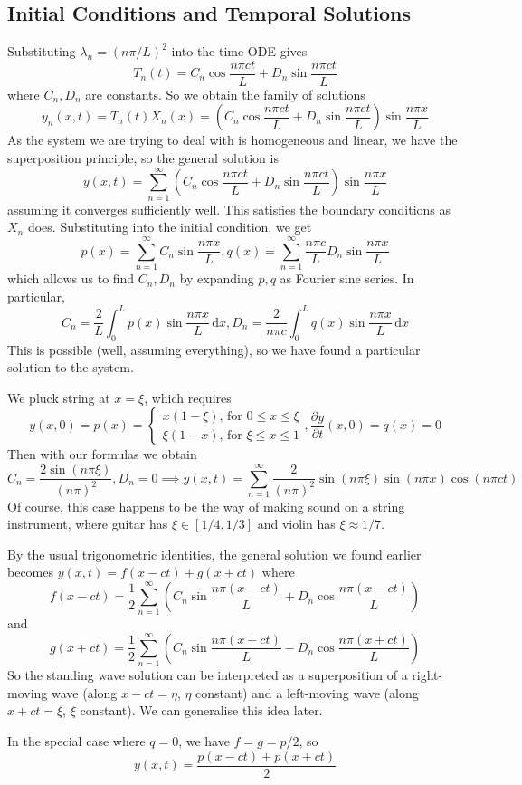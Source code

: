 \subsection{Initial Conditions and Temporal Solutions}
Substituting $\lambda_n=(n\pi/L)^2$ into the time ODE gives
$$T_n(t)=C_n\cos\frac{n\pi ct}{L}+D_n\sin\frac{n\pi ct}{L}$$
where $C_n,D_n$ are constants.
So we obtain the family of solutions
$$y_n(x,t)=T_n(t)X_n(x)=\left( C_n\cos\frac{n\pi ct}{L}+D_n\sin\frac{n\pi ct}{L} \right)\sin\frac{n\pi x}{L}$$
As the system we are trying to deal with is homogeneous and linear, we have the superposition principle, so the general solution is
$$y(x,t)=\sum_{n=1}^\infty\left( C_n\cos\frac{n\pi ct}{L}+D_n\sin\frac{n\pi ct}{L} \right)\sin\frac{n\pi x}{L}$$
assuming it converges sufficiently well.
This satisfies the boundary conditions as $X_n$ does.
Substituting into the initial condition, we get
$$p(x)=\sum_{n=1}^\infty C_n\sin\frac{n\pi x}{L},q(x)=\sum_{n=1}^\infty\frac{n\pi c}{L}D_n\sin\frac{n\pi x}{L}$$
which allows us to find $C_n,D_n$ by expanding $p,q$ as Fourier sine series.
In particular,
$$C_n=\frac{2}{L}\int_0^Lp(x)\sin\frac{n\pi x}{L}\,\mathrm dx,D_n=\frac{2}{n\pi c}\int_0^Lq(x)\sin\frac{n\pi x}{L}\,\mathrm dx$$
This is possible (well, assuming everything), so we have found a particular solution to the system.
\begin{example}
    We pluck string at $x=\xi$, which requires
    $$y(x,0)=p(x)=\begin{cases}
        x(1-\xi)\text{, for $0\le x\le \xi$}\\
        \xi(1-x)\text{, for $\xi\le x\le 1$}
    \end{cases},\frac{\partial y}{\partial t}(x,0)=q(x)=0$$
    Then with our formulas we obtain
    $$C_n=\frac{2\sin(n\pi\xi)}{(n\pi)^2},D_n=0\implies y(x,t)=\sum_{n=1}^\infty\frac{2}{(n\pi)^2}\sin(n\pi\xi)\sin(n\pi x)\cos(n\pi ct)$$
    Of course, this case happens to be the way of making sound on a string instrument, where guitar has $\xi\in [1/4,1/3]$ and violin has $\xi\approx 1/7$.
\end{example}
By the usual trigonometric identities, the general solution we found earlier becomes $y(x,t)=f(x-ct)+g(x+ct)$ where
$$f(x-ct)=\frac{1}{2}\sum_{n=1}^\infty\left(C_n\sin\frac{n\pi(x-ct)}{L}+D_n\cos\frac{n\pi(x-ct)}{L}\right)$$
and
$$g(x+ct)=\frac{1}{2}\sum_{n=1}^\infty\left(C_n\sin\frac{n\pi(x+ct)}{L}-D_n\cos\frac{n\pi(x+ct)}{L}\right)$$
So the standing wave solution can be interpreted as a superposition of a right-moving wave (along $x-ct=\eta$, $\eta$ constant) and a left-moving wave (along $x+ct=\xi$, $\xi$ constant).
We can generalise this idea later.
\begin{example}
    In the special case where $q=0$, we have $f=g=p/2$, so
    $$y(x,t)=\frac{p(x-ct)+p(x+ct)}{2}$$
\end{example}
